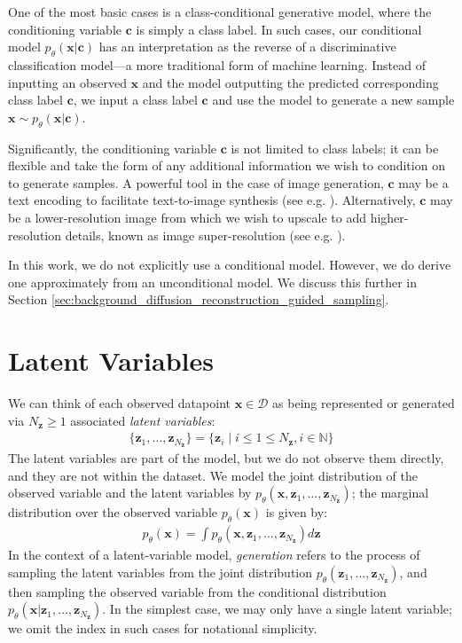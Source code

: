 \documentclass[ oneside,%
                    author={George Herbert},
                    degree={MSci},
                     title={Diffusion Models for Time-Evolving Precipitation Fields},
                  subtitle={}]{dissertation}
\begin{document}
One of the most basic cases is a class-conditional generative model, where the conditioning variable $\mathbf{c}$ is simply a class label. In such cases, our conditional model $p_\theta(\mathbf{x}|\mathbf{c})$ has an interpretation as the reverse of a discriminative classification model---a more traditional form of machine learning. Instead of inputting an observed $\mathbf{x}$ and the model outputting the predicted corresponding class label $\mathbf{c}$, we input a class label $\mathbf{c}$ and use the model to generate a new sample $\mathbf{x}\sim p_\theta(\mathbf{x}|\mathbf{c})$.

Significantly, the conditioning variable $\mathbf{c}$ is not limited to class labels; it can be flexible and take the form of any additional information we wish to condition on to generate samples. A powerful tool in the case of image generation, $\mathbf{c}$ may be a text encoding to facilitate text-to-image synthesis (see e.g. \cite{Imagen_Saharia,Simple_Diffusion_Hoogeboom}). Alternatively, $\mathbf{c}$ may be a lower-resolution image from which we wish to upscale to add higher-resolution details, known as image super-resolution (see e.g. \cite{Cascaded_Ho}).

In this work, we do not explicitly use a conditional model. However, we do derive one approximately from an unconditional model. We discuss this further in Section \ref{sec:background_diffusion_reconstruction_guided_sampling}.

\section{Latent Variables}
\label{sec:background_latent}

We can think of each observed datapoint $\mathbf{x}\in\mathcal{D}$ as being represented or generated via $N_{\mathbf{z}}\ge 1$ associated \textit{latent variables}:
\begin{align}
      \{\mathbf{z}_1,\ldots,\mathbf{z}_{N_\mathbf{z}}\} = \{\mathbf{z}_i \mid i \le 1 \le N_{\mathbf{z}}, i \in \mathbb{N} \}
\end{align}
The latent variables are part of the model, but we do not observe them directly, and they are not within the dataset. We model the joint distribution of the observed variable and the latent variables by $p_\theta(\mathbf{x},\mathbf{z}_1,\ldots,\mathbf{z}_{N_\mathbf{z}})$; the marginal distribution over the observed variable $p_\theta(\mathbf{x})$ is given by:
\begin{align}
      p_\theta(\mathbf{x})=\int p_\theta(\mathbf{x},\mathbf{z}_1,\ldots,\mathbf{z}_{N_\mathbf{z}}) d\mathbf{z}
\end{align}
In the context of a latent-variable model, \textit{generation} refers to the process of sampling the latent variables from the joint distribution $p_\theta(\mathbf{z}_1,\ldots,\mathbf{z}_{N_\mathbf{z}})$, and then sampling the observed variable from the conditional distribution $p_\theta(\mathbf{x}|\mathbf{z}_1,\ldots,\mathbf{z}_{N_\mathbf{z}})$. In the simplest case, we may only have a single latent variable; we omit the index in such cases for notational simplicity.
\end{document}
